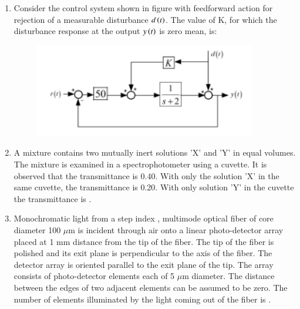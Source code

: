 \documentclass[journal,12pt,onecolumn]{IEEEtran}
\theoremstyle{remark}
\begin{document}
\begin{enumerate}
    \hfill{}

    

    \item Consider the control system shown in figure with feedforward action for rejection of a measurable disturbance $d\left(t\right)$. The value of K, for which the disturbance response at the output $y\left(t\right)$ is zero mean, is:
    \begin{figure}[H]
        \centering
        \includegraphics[width=0.62\columnwidth]{q51}
        \caption*{}
        \label{Q51}
    \end{figure}

    \hfill{}
        \begin{enumerate}
        \end{enumerate}

    \item A mixture contains two mutually inert solutions 'X' and 'Y' in equal volumes. The mixture is examined in a spectrophotometer using a cuvette. It is observed that the transmittance is 0.40. With only the solution 'X' in the same cuvette, the transmittance is 0.20. With only solution 'Y' in the cuvette the transmittance is \underline{\hspace{2cm}}.

    \hfill{}

    
    
    \item Monochromatic light from a step index , multimode optical fiber of core diameter 100 $\mu$m is incident through air  onto a linear photo-detector array placed at 1 mm distance from the tip of the fiber. The tip of the fiber is polished and its exit plane is perpendicular to the axis of the fiber. The detector array is oriented parallel to the exit plane of the tip. The array consists of photo-detector elements each of 5 $\mu$m diameter. The distance between the edges of two adjacent elements can be assumed to be zero. The number of elements illuminated by the light coming out of the fiber is \underline{\hspace{2cm}}.


\end{enumerate}
\end{document}
